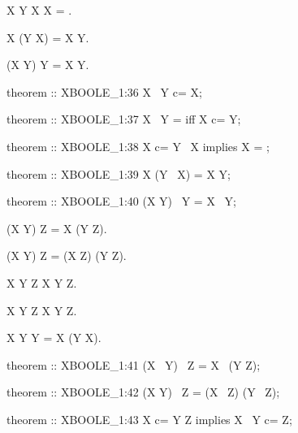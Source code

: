 \begin{paracol}{2}
\begin{theorem}
  X \subset Y \setminus X \implies X = \emptyset.
\end{theorem}

\begin{theorem}
  X \cup (Y \setminus X) = X \cup Y.
\end{theorem}

\begin{theorem}
  (X \cup Y) \setminus Y = X \setminus Y.
\end{theorem}

\switchcolumn

\begin{mizar}
theorem :: XBOOLE_1:36
  X \ Y c= X;

theorem :: XBOOLE_1:37
  X \ Y = {} iff X c= Y;

theorem :: XBOOLE_1:38
  X c= Y \ X implies X = {};

theorem :: XBOOLE_1:39
  X \/ (Y \ X) = X \/ Y;

theorem :: XBOOLE_1:40
  (X \/ Y) \ Y = X \ Y;
\end{mizar}

\switchcolumn*\ensurevspace{5cm}

\begin{theorem}
  (X \setminus Y) \setminus Z = X \setminus (Y \cup Z).
\end{theorem}

\begin{theorem}
  (X \cup Y) \setminus Z = (X \setminus Z) \cup (Y \setminus Z).
\end{theorem}

\begin{theorem}
  X \subset Y \cup Z \implies X \setminus Y \subset Z.
\end{theorem}

\begin{theorem}
  X \setminus Y \subset Z \implies X \subset Y \cup Z.
\end{theorem}

\begin{theorem}
  X \subset Y \implies Y = X \cup (Y \setminus X).
\end{theorem}

\switchcolumn

\begin{mizar}
theorem :: XBOOLE_1:41
  (X \ Y) \ Z = X \ (Y \/ Z);

theorem :: XBOOLE_1:42
  (X \/ Y) \ Z = (X \ Z) \/ (Y \ Z);

theorem :: XBOOLE_1:43
  X c= Y \/ Z implies X \ Y c= Z;


\end{mizar}
\end{paracol}
